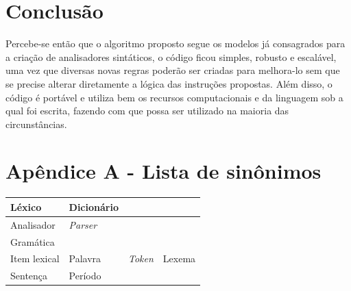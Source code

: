 \documentclass[12pt,a4paper,oneside,english,brazilian,brazil]{abntex2}
\begin{document}
\chapter{Conclusão}

Percebe-se então que o algoritmo proposto segue os modelos já consagrados para a criação de analisadores sintáticos, o código ficou simples, robusto e escalável, uma vez que diversas novas regras poderão ser criadas para melhora-lo sem que se precise alterar diretamente a lógica das instruções propostas. Além disso, o código é portável e utiliza bem os recursos computacionais e da linguagem sob a qual foi escrita, fazendo com que possa ser utilizado na maioria das circunstâncias.



\chapter*{Apêndice A - Lista de sinônimos}

\centering
\begin{tabular}{|l|l|l|l|}
\hline 
Léxico & Dicionário & & \\ 
\hline 
Analisador & \textit{Parser} & &\\ 
\hline 
Gramática & & &\\ 
\hline 
Item lexical & Palavra & \textit{Token} & Lexema\\ 
\hline 
Sentença & Período & &\\ 
\hline 
\end{tabular} 


\postextual


\nocite{trabaca}


\end{document}

